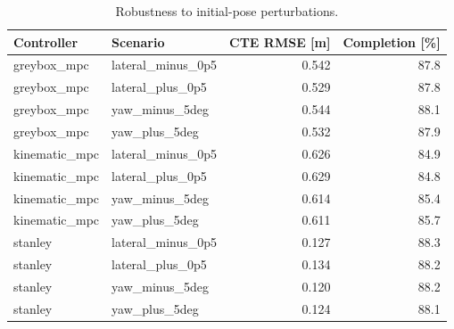 \begin{table}[t]
\centering
\caption{Robustness to initial-pose perturbations.}
\label{tab:robustness}
\begin{tabular}{llrr}
\hline
Controller & Scenario & CTE RMSE [m] & Completion [\%] \\
\hline
greybox\_mpc & lateral\_minus\_0p5 & 0.542 & 87.8 \\
greybox\_mpc & lateral\_plus\_0p5 & 0.529 & 87.8 \\
greybox\_mpc & yaw\_minus\_5deg & 0.544 & 88.1 \\
greybox\_mpc & yaw\_plus\_5deg & 0.532 & 87.9 \\
kinematic\_mpc & lateral\_minus\_0p5 & 0.626 & 84.9 \\
kinematic\_mpc & lateral\_plus\_0p5 & 0.629 & 84.8 \\
kinematic\_mpc & yaw\_minus\_5deg & 0.614 & 85.4 \\
kinematic\_mpc & yaw\_plus\_5deg & 0.611 & 85.7 \\
stanley & lateral\_minus\_0p5 & 0.127 & 88.3 \\
stanley & lateral\_plus\_0p5 & 0.134 & 88.2 \\
stanley & yaw\_minus\_5deg & 0.120 & 88.2 \\
stanley & yaw\_plus\_5deg & 0.124 & 88.1 \\
\hline
\end{tabular}
\end{table}
